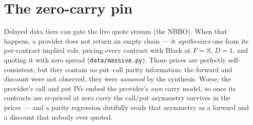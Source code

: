 \documentclass[11pt]{article}
\begin{document}
\section{The zero-carry pin}
\label{sec:zerocarry}

Delayed data tiers can gate the live quote stream (the NBBO). When that
happens, a provider does not return an empty chain --- it \emph{synthesizes}
one from its per-contract implied vols, pricing every contract with Black at
$F=S$, $D=1$, and quoting it with zero spread
(\texttt{data/massive.py}). Those prices are perfectly self-consistent, but
they contain \emph{no} put--call parity information: the forward and discount
were not observed, they were \emph{assumed} by the synthesis. Worse, the
provider's call and put IVs embed the provider's \emph{own} carry model, so
once its contracts are re-priced at zero carry the call/put asymmetry survives
in the prices --- and a parity regression dutifully reads that asymmetry as a
forward and a discount that nobody ever quoted.
\end{document}
